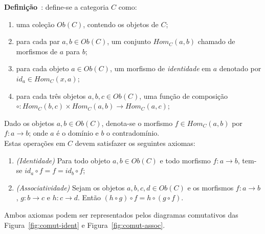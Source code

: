 \documentclass[10pt, conference]{IEEEtran}
\begin{document}
\textbf{Definição}~\cite{spivak2014cts, maclane1971mat}: define-se a categoria $C$ como:

\begin{enumerate}[label=(\alph*), leftmargin=3em, topsep = 0pt, itemsep = 1ex, partopsep = 1ex, parsep = 1ex]
	\item uma coleção ${Ob(C)}$, contendo os objetos de $C$;
	\item para cada par ${a, b \in Ob(C)}$, um conjunto ${Hom_C(a, b)}$ chamado de morfismos de $a$ para $b$;
	\item para cada objeto ${a \in Ob(C)}$, um morfismo de \textit{identidade} em $a$ denotado por ${id_a \in Hom_C(x, a)}$;
	\item para cada três objetos ${a, b, c \in Ob(C)}$, uma função de composição $\circ: Hom_C(b, c) \times Hom_C(a, b) \rightarrow Hom_C(a, c)$;
\end{enumerate}

Dado os objetos $a, b \in Ob(C)$, denota-se o morfismo $f \in Hom_C(a, b)$ por $f: a \rightarrow b$; onde $a$ é o domínio e $b$ o contradomínio.\\	

Estas operações em $C$ devem satisfazer os seguintes axiomas:

\begin{enumerate}[label={}, leftmargin = 2em, topsep = 0pt, itemsep = 1ex,partopsep = 1ex, parsep = 1ex]
	\item \textit{(Identidade)} Para todo objeto $a, b \in Ob(C)$ e todo morfismo $f: a \rightarrow b$, tem-se $id_a \circ f = f = id_b \circ f$;
	\item \textit{(Associatividade)} Sejam os objetos $a, b, c, d \in Ob(C)$ e os morfismos $f: a \rightarrow b$, $g: b \rightarrow c$ e $h: c \rightarrow d$. Então $(h \circ g) \circ f = h \circ (g \circ f)$.
\end{enumerate}

Ambos axiomas podem ser representados pelos diagramas comutativos das Figura~\ref{fig:comut-ident} e Figura~\ref{fig:comut-assoc}.
\end{document}
